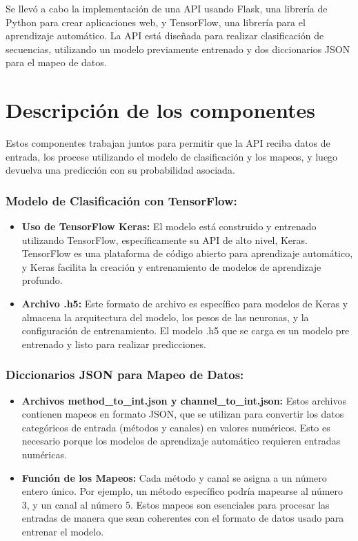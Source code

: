 Se llevó a cabo la implementación de una API usando Flask, una librería de Python para crear aplicaciones web, y TensorFlow, una librería para el aprendizaje automático. La API está diseñada para realizar clasificación de secuencias, utilizando un modelo previamente entrenado y dos diccionarios JSON para el mapeo de datos.

\section{Descripción de los componentes}

Estos componentes trabajan juntos para permitir que la API reciba datos de entrada, los procese utilizando el modelo de clasificación y los mapeos, y luego devuelva una predicción con su probabilidad asociada.

\subsubsection{Modelo de Clasificación con TensorFlow:}

\begin{itemize}
    \item \textbf{Uso de TensorFlow Keras:} El modelo está construido y entrenado utilizando TensorFlow, específicamente su API de alto nivel, Keras. TensorFlow es una plataforma de código abierto para aprendizaje automático, y Keras facilita la creación y entrenamiento de modelos de aprendizaje profundo.
    \item \textbf{Archivo .h5:} Este formato de archivo es específico para modelos de Keras y almacena la arquitectura del modelo, los pesos de las neuronas, y la configuración de entrenamiento. El modelo .h5 que se carga es un modelo pre entrenado y listo para realizar predicciones.
\end{itemize}

\subsubsection{Diccionarios JSON para Mapeo de Datos:}

\begin{itemize}
    \item \textbf{Archivos method\_to\_int.json y channel\_to\_int.json:} Estos archivos contienen mapeos en formato JSON, que se utilizan para convertir los datos categóricos de entrada (métodos y canales) en valores numéricos. Esto es necesario porque los modelos de aprendizaje automático requieren entradas numéricas.
    \item \textbf{Función de los Mapeos:} Cada método y canal se asigna a un número entero único. Por ejemplo, un método específico podría mapearse al número 3, y un canal al número 5. Estos mapeos son esenciales para procesar las entradas de manera que sean coherentes con el formato de datos usado para entrenar el modelo.
\end{itemize}

